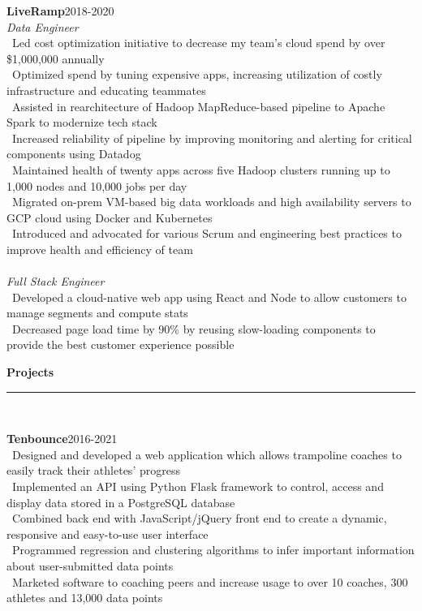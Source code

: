 \documentclass[a4paper,10pt]{article}
\newcommand{\horizontalline}{{\rule{533pt}{0.625pt}\\}}
\renewcommand{\section}[1]{{\noindent\textbf{\large #1}\\\horizontalline}}
\renewcommand{\subsection}[2]{{\noindent \textbf{#1}\hfill \textsc{#2}\\}}
\begin{document}
\subsection{LiveRamp}{2018-2020}
\textit{Data Engineer}\\
\textbullet\ Led cost optimization initiative to decrease my team's cloud spend by over \$1,000,000 annually\\
\textbullet\ Optimized spend by tuning expensive apps, increasing utilization of costly infrastructure and educating teammates\\
\textbullet\ Assisted in rearchitecture of Hadoop MapReduce-based pipeline to Apache Spark to modernize tech stack\\
\textbullet\ Increased reliability of pipeline by improving monitoring and alerting for critical components using Datadog\\
\textbullet\ Maintained health of twenty apps across five Hadoop clusters running up to 1,000 nodes and 10,000 jobs per day\\
\textbullet\ Migrated on-prem VM-based big data workloads and high availability servers to GCP cloud using Docker and Kubernetes\\
\textbullet\ Introduced and advocated for various Scrum and engineering best practices to improve health and efficiency of team\\ \\
\textit{Full Stack Engineer}\\
\textbullet\ Developed a cloud-native web app using React and Node to allow customers to manage segments and compute stats\\
\textbullet\ Decreased page load time by 90\% by reusing slow-loading components to provide the best customer experience possible\\

\section{Projects}
\subsection{Tenbounce}{2016-2021}
\textbullet\ Designed and developed a web application which allows trampoline coaches to easily track their athletes' progress\\
\textbullet\ Implemented an API using Python Flask framework to control, access and display data stored in a PostgreSQL database\\
\textbullet\ Combined back end with JavaScript/jQuery front end to create a dynamic, responsive and easy-to-use user interface\\
\textbullet\ Programmed regression and clustering algorithms to infer important information about user-submitted data points\\
\textbullet\ Marketed software to coaching peers and increase usage to over 10 coaches, 300 athletes and 13,000 data points\\
\end{document}
